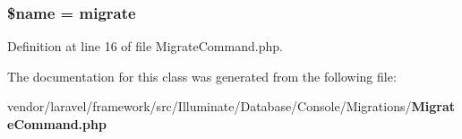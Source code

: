 \subsubsection[{\$name}]{\setlength{\rightskip}{0pt plus 5cm}\${\bf name} = \textquotesingle{}migrate\textquotesingle{}\hspace{0.3cm}{\ttfamily [protected]}}\label{class_illuminate_1_1_database_1_1_console_1_1_migrations_1_1_migrate_command_ab2fc40d43824ea3e1ce5d86dee0d763b}


Definition at line 16 of file Migrate\+Command.\+php.



The documentation for this class was generated from the following file\+:\begin{DoxyCompactItemize}
\item 
vendor/laravel/framework/src/\+Illuminate/\+Database/\+Console/\+Migrations/{\bf Migrate\+Command.\+php}\end{DoxyCompactItemize}
